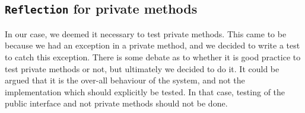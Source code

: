 %
%
%

\subsection{\texttt{Reflection} for private methods}\label{sec:privTest}
In our case, we deemed it necessary to test private methods. This came to be because we had an exception in a private method, and we decided to write a test to catch this exception. There is some debate as to whether it is good practice to test private methods or not, but ultimately we decided to do it. It could be argued that it is the over-all behaviour of the system, and not the implementation which should explicitly be tested. In that case, testing of the public interface and not private methods should not be done.
% 
